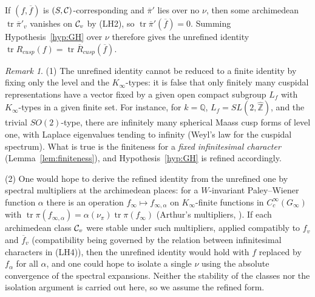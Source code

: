 \documentclass[12pt,letterpaper]{book}
\theoremstyle{plain}
\theoremstyle{definition}
\theoremstyle{remark}
\newtheorem{remark}[theorem]{Remark}
\theoremstyle{remark}
\newcommand{\tr}{\operatorname{tr}}
\begin{document}
If $(f,\overline f)$ is $(S,{\cal C})$-corresponding and $\overline\pi'$
lies over no $\nu$, then some archimedean $\tr\overline\pi'_v$ vanishes on
${\cal C}_v$ by (LH2), so $\tr\overline\pi'(\overline f)=0$. Summing
Hypothesis~\ref{hyp:GH} over $\nu$ therefore gives
the unrefined identity $\tr R_{cusp}(f)=\tr\overline R_{cusp}(\overline f)$.

\begin{remark}\label{rem:why-refine}
(1) The unrefined identity cannot be reduced to a finite identity by
fixing only the level and the $K_\infty$-types: it is false that only
finitely many cuspidal representations have a vector fixed by a given
open compact subgroup $L_f$ with $K_\infty$-types in a given finite set.
For instance, for $k={\mathbb Q}$, $L_f=SL(2,\widehat{\mathbb Z})$, and the
trivial $SO(2)$-type, there are infinitely many spherical Maass cusp forms
of level one, with Laplace eigenvalues tending to infinity (Weyl's law
for the cuspidal spectrum). What is true is the finiteness for a
\emph{fixed infinitesimal character} (Lemma~\ref{lem:finiteness}), and
Hypothesis~\ref{hyp:GH} is refined accordingly.

(2) One would hope to derive the refined identity from the unrefined one
by spectral multipliers at the archimedean places: for a $W$-invariant
Paley--Wiener function $\alpha$ there is an operation
$f_\infty\mapsto f_{\infty,\alpha}$ on $K_\infty$-finite functions in
$C_c^\infty(G_\infty)$ with $\tr\pi(f_{\infty,\alpha})=\alpha(\nu_\pi)\tr\pi(f_\infty)$
(Arthur's multipliers, \cite{APW}). If each archimedean class ${\cal C}_v$
were stable under such multipliers, applied compatibly to $f_v$ and
$\overline f_v$ (compatibility being governed by the relation between
infinitesimal characters in (LH4)), then the unrefined identity would hold
with $f$ replaced by $f_\alpha$ for all $\alpha$, and one could hope to
isolate a single $\nu$ using the absolute convergence of the spectral
expansions. Neither the stability of the classes nor the isolation
argument is carried out here, so we assume the refined form.
\end{remark}
\end{document}
